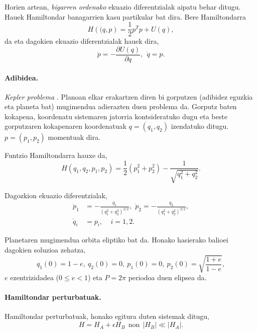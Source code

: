 Horien artean, \emph{bigarren ordenako} ekuazio diferentzialak aipatu behar ditugu. Hauek Hamiltondar banagarrien kasu partikular bat dira. Bere Hamiltondarra  
\begin{equation*}
H(\mathbf(q,p)=\frac{1}{2}p^Tp +U(q),
\end{equation*}
da eta dagokien ekuazio diferentzialak hauek dira,
\begin{equation}
\label{eq:biorden}
\dot{p}=-\frac{\partial U(q)}{\partial q}, \ \ \dot{q}=p. 
\end{equation}

\paragraph*{Adibidea.}
\emph{Kepler problema} \cite{Hairer2006}. Planoan elkar erakartzen diren bi gorputzen (adibidez eguzkia eta planeta bat) mugimendua adierazten duen problema da. Gorputz baten kokapena, koordenatu sistemaren jatorria kontsideratuko dugu eta beste gorputzaren kokapenaren koordenatuak $q=(q_1,q_2)$ izendatuko ditugu. $p=(p_1,p_2)$ momentuak dira. 

Funtzio Hamiltondarra hauxe da,
\begin{equation*}
H(q_1,q_2,p_1,p_2)=\frac{1}{2}(p_1^2+p_2^2)-\frac{1}{\sqrt{q_1^2+q_2^2}}.
\end{equation*}

Dagozkion ekuazio diferentzialak,
\begin{align*}
\dot{p}_1 &= -\frac{q_1}{(q_1^2+q_2^2)^{3/2}}, \ \, \dot{p}_2= -\frac{q_2}{(q_1^2+q_2^2)^{3/2}}, \\
\dot{q}_i &=p_i, \ \ \ \ \ i=1,2.
\end{align*}

Planetaren mugimendua orbita eliptiko bat da. Honako hasierako balioei dagokien soluzioa zehatza,
\begin{equation*}
q_1(0)=1-e, \ q_2(0)=0, \ p_1(0)=0, \ p_2(0)=\sqrt{ \frac{1+e}{1-e}}, 
\end{equation*}
$e$ ezentrizidadea ($0\le e < 1$)  eta $P=2\pi$ periodoa duen elipsea da. 

\paragraph*{Hamiltondar perturbatuak.} Hamiltondar perturbatuak, honako egitura duten sistemak ditugu,
\begin{equation*}
H=H_A+\epsilon H_B \ \  \text{non} \ \ |H_B|\ll |H_A|.
\end{equation*}

